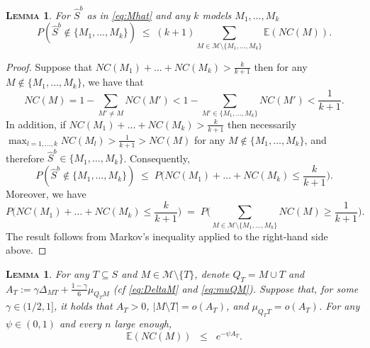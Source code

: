 \documentclass[bj,authoryear]{imsart}
\theoremstyle{plain}
\newtheorem{lem}[thm]{\textsc{Lemma}}
\newcommand{\E}{\mathbb{E}}
\newcommand{\M}{\mathcal{M}}
\begin{document}
\begin{lem}\label{lem:L0toL1convergencegen} For $\hat S^b$ as in \eqref{eq:Mhat} and any $k$ models $M_1,\ldots,M_k$
$$P(\hat{S}^b\not\in \{M_1,\ldots,M_k\})\;\leq\; (k+1) \sum_{M \in \M\setminus \{M_1,\ldots,M_k\}}\E\left( NC(M)\right).$$
\end{lem}

\begin{proof}
Suppose that $NC(M_1)+\ldots+NC(M_k)>\frac{k}{k+1}$ then for any $M\not\in \{M_1,\ldots,M_k\}$, we have that
$$NC(M)= 1-\sum_{M' \neq M} NC(M') < 1 - \sum_{M' \in \{M_1,\ldots,M_k\}} NC(M') < \frac{1}{k+1}.$$ 
In addition, if $NC(M_1)+\ldots+NC(M_k)>\frac{k}{k+1}$ then necessarily $\max_{l=1,\ldots,k}NC(M_l)> \frac{1}{k+1} > NC(M) $ for any $M \not\in \{M_1,\ldots,M_k\}$, and therefore $\hat{S}^{b}\in \{M_1,\ldots,M_k\}$. Consequently, 
$$
P(\hat{S}^b\not\in \{M_1,\ldots,M_k\})\; \leq\; P\Big(NC(M_1)+\ldots+NC(M_k)\leq\frac{k}{k+1}\Big).$$
Moreover, we have
$$P\Big(NC(M_1)+\ldots+NC(M_k)\leq\frac{k}{k+1}\Big)\;=\;P\Big(\sum_{M \in \M\setminus \{M_1,\ldots,M_k\}} NC(M)\geq \frac{1}{k+1}\Big).$$
The result follows from Markov's inequality applied to the right-hand side above.
\end{proof}

\begin{lem}\label{lem:boundexpnc} For any $T\subseteq S$ and $M\in \M\setminus\{T\}$, denote $Q_T= M\cup T$ and $A_T:=\gamma\Delta_{MT}+\tfrac{1-\gamma}{6}\mu_{Q_TM}$ (\emph{cf} \eqref{eq:DeltaM} and \eqref{eq:muQM}). Suppose that, for some $\gamma \in (1/2,1]$, it holds that $A_T>0$, $|M\setminus T|=o(A_T)$, and $\mu_{Q_T T}=o(A_T)$. For any $\psi\in(0,1)$ and every $n$ large enough,
$$\E\left(NC(M)\right)  \;\;\leq\;\; e^{-\psi A_T}.$$
\end{lem}
\end{document}
